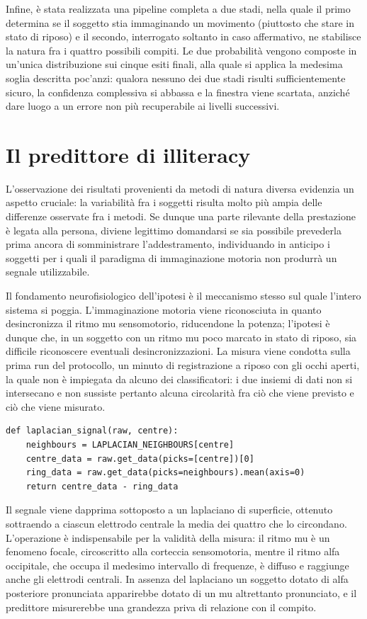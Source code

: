 Infine, è stata realizzata una pipeline completa a due stadi, nella quale il primo determina se il soggetto stia immaginando un movimento (piuttosto che stare in stato di riposo) e il secondo, interrogato soltanto in caso affermativo, ne stabilisce la natura fra i quattro possibili compiti. Le due probabilità vengono composte in un’unica distribuzione sui cinque esiti finali, alla quale si applica la medesima soglia descritta poc’anzi: qualora nessuno dei due stadi risulti sufficientemente sicuro, la confidenza complessiva si abbassa e la finestra viene scartata, anziché dare luogo a un errore non più recuperabile ai livelli successivi.

\section{Il predittore di illiteracy}
L'osservazione dei risultati provenienti da metodi di natura diversa evidenzia un aspetto cruciale: la variabilità fra i soggetti risulta molto più ampia delle differenze osservate fra i metodi. Se dunque una parte rilevante della prestazione è legata alla persona, diviene legittimo domandarsi se sia possibile prevederla prima ancora di somministrare l’addestramento, individuando in anticipo i soggetti per i quali il paradigma di immaginazione motoria non produrrà un segnale utilizzabile.

Il fondamento neurofisiologico dell’ipotesi è il meccanismo stesso sul quale l’intero sistema si poggia. L’immaginazione motoria viene riconosciuta in quanto desincronizza il ritmo mu sensomotorio, riducendone la potenza; l'ipotesi è dunque che, in un soggetto con un ritmo mu poco marcato in stato di riposo, sia difficile riconoscere eventuali desincronizzazioni. La misura viene condotta sulla prima run del protocollo, un minuto di registrazione a riposo con gli occhi aperti, la quale non è impiegata da alcuno dei classificatori: i due insiemi di dati non si intersecano e non sussiste pertanto alcuna circolarità fra ciò che viene previsto e ciò che viene misurato.

\begin{lstlisting}
def laplacian_signal(raw, centre):
    neighbours = LAPLACIAN_NEIGHBOURS[centre]
    centre_data = raw.get_data(picks=[centre])[0]
    ring_data = raw.get_data(picks=neighbours).mean(axis=0)
    return centre_data - ring_data
\end{lstlisting}

Il segnale viene dapprima sottoposto a un laplaciano di superficie, ottenuto sottraendo a ciascun elettrodo centrale la media dei quattro che lo circondano. L’operazione è indispensabile per la validità della misura: il ritmo mu è un fenomeno focale, circoscritto alla corteccia sensomotoria, mentre il ritmo alfa occipitale, che occupa il medesimo intervallo di frequenze, è diffuso e raggiunge anche gli elettrodi centrali. In assenza del laplaciano un soggetto dotato di alfa posteriore pronunciata apparirebbe dotato di un mu altrettanto pronunciato, e il predittore misurerebbe una grandezza priva di relazione con il compito.

